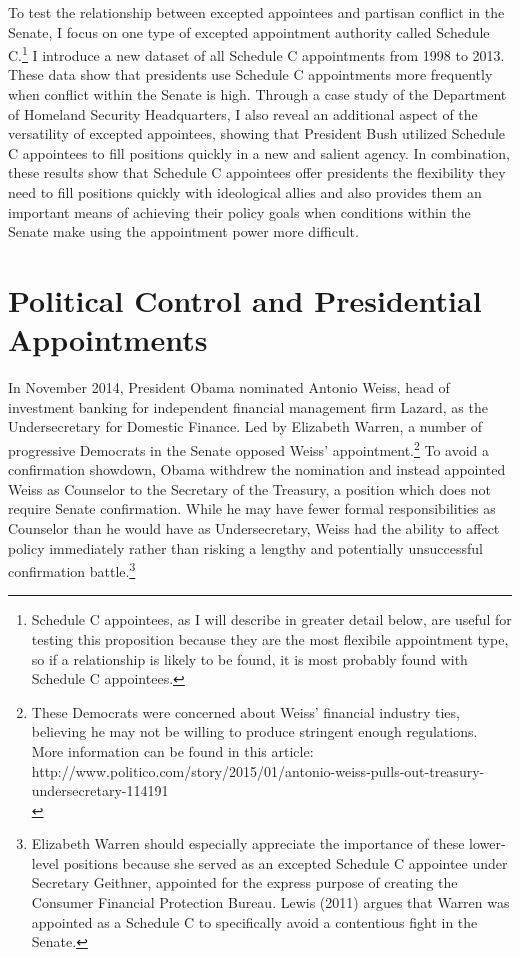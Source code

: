\documentclass[12pt]{article}
\begin{document}
	To test the relationship between excepted appointees and partisan conflict in the Senate, I focus on one type of excepted appointment authority called Schedule C.\footnote{Schedule C appointees, as I will describe in greater detail below, are useful for testing this proposition because they are the most flexibile appointment type, so if a relationship is likely to be found, it is most probably found with Schedule C appointees.} I introduce a new dataset of all Schedule C appointments from 1998 to 2013. These data show that presidents use Schedule C appointments more frequently when conflict within the Senate is high. Through a case study of the Department of Homeland Security Headquarters, I also reveal an additional aspect of the versatility of excepted appointees, showing that President Bush utilized Schedule C appointees to fill positions quickly in a new and salient agency. In combination, these results show that Schedule C appointees offer presidents the flexibility they need to fill positions quickly with ideological allies and also provides them an important means of achieving their policy goals when conditions within the Senate make using the appointment power more difficult.

\section*{Political Control and Presidential Appointments}
In November 2014, President Obama nominated Antonio Weiss, head of investment banking for independent financial management firm Lazard, as the Undersecretary for Domestic Finance. Led by Elizabeth Warren, a number of progressive Democrats in the Senate opposed Weiss' appointment.\footnote{ These Democrats were concerned about Weiss' financial industry ties, believing he may not be willing to produce stringent enough regulations. More information can be found in this article: http://www.politico.com/story/2015/01/antonio-weiss-pulls-out-treasury-undersecretary-114191\\} To avoid a confirmation showdown, Obama withdrew the nomination and instead appointed Weiss as Counselor to the Secretary of the Treasury, a position which does not require Senate confirmation. While he may have fewer formal responsibilities as Counselor than he would have as Undersecretary, Weiss had the ability to affect policy immediately rather than risking a lengthy and potentially unsuccessful confirmation battle.\footnote{Elizabeth Warren should especially appreciate the importance of these lower-level positions because she served as an excepted Schedule C appointee under Secretary Geithner, appointed for the express purpose of creating the Consumer Financial Protection Bureau. Lewis (2011) argues that Warren was appointed as a Schedule C to specifically avoid a contentious fight in the Senate.}
	
\end{document}
